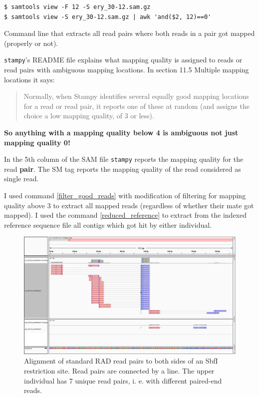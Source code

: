 \documentclass{article}\usepackage[]{graphicx}\usepackage[]{color}
\begin{document}
\begin{command}
\captionsetup{type=command} %
\begin{Verbatim}
$ samtools view -F 12 -S ery_30-12.sam.gz
$ samtools view -S ery_30-12.sam.gz | awk 'and($2, 12)==0'
\end{Verbatim}
\caption{Command line that extracts all read pairs where both reads in a pair got mapped (properly or not).}
\label{filter_unmapped_read_pairs}
\end{command}

\texttt{stampy}'s README file explains what mapping quality is assigned to reads or read pairs with ambiguous mapping locations. In section \textrm{11.5 Multiple mapping locations} it says:
\begin{quote}
\textsf{
Normally, when Stampy identifies several equally good mapping locations for a read or read pair, it reports one of these at random (and assigns the choice a low mapping quality, of 3 or less).
}
\end{quote}
\textbf{So anything with a mapping quality below 4 is ambiguous not just mapping quality 0!}

In the 5th column of the SAM file \texttt{stampy} reports the mapping quality for the read \textbf{pair}. The SM tag reports the mapping quality of the read considered as single read.

I used command \ref{filter_good_reads} with modification of filtering for mapping quality above 3 to extract all mapped reads (regardless of whether their mate got mapped).
I used the command \ref{reduced_reference} to extract from the indexed reference sequence file all contigs which got hit by either individual.
\begin{figure}
\centering
\includegraphics[width=\textwidth]{./figure/igv_LC_1628_C1_Contig1776_standRAD}
\caption{Alignment of standard RAD read pairs to both sides of an SbfI restriction site. Read pairs are connected by a line. The upper individual has 7 unique read pairs, i. e. with different paired-end reads.}
\label{LC.1628.C1.Contig1776_standRAD}
\end{figure}
\end{document}
